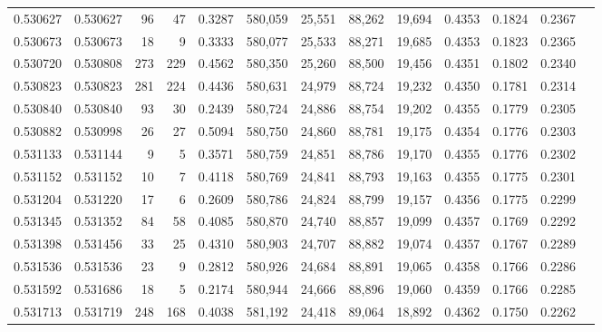 \begin{tabular}{rrrrrrrrrrrrr}
0.530627 & 0.530627 &    96 &    47 &                                     0.3287 & 580,059 &  25,551 &  88,262 &  19,694 & 0.4353 & 0.1824 & 0.2367 \\
0.530673 & 0.530673 &    18 &     9 &                                     0.3333 & 580,077 &  25,533 &  88,271 &  19,685 & 0.4353 & 0.1823 & 0.2365 \\
0.530720 & 0.530808 &   273 &   229 &                                     0.4562 & 580,350 &  25,260 &  88,500 &  19,456 & 0.4351 & 0.1802 & 0.2340 \\
0.530823 & 0.530823 &   281 &   224 &                                     0.4436 & 580,631 &  24,979 &  88,724 &  19,232 & 0.4350 & 0.1781 & 0.2314 \\
0.530840 & 0.530840 &    93 &    30 &                                     0.2439 & 580,724 &  24,886 &  88,754 &  19,202 & 0.4355 & 0.1779 & 0.2305 \\
0.530882 & 0.530998 &    26 &    27 &                                     0.5094 & 580,750 &  24,860 &  88,781 &  19,175 & 0.4354 & 0.1776 & 0.2303 \\
0.531133 & 0.531144 &     9 &     5 &                                     0.3571 & 580,759 &  24,851 &  88,786 &  19,170 & 0.4355 & 0.1776 & 0.2302 \\
0.531152 & 0.531152 &    10 &     7 &                                     0.4118 & 580,769 &  24,841 &  88,793 &  19,163 & 0.4355 & 0.1775 & 0.2301 \\
0.531204 & 0.531220 &    17 &     6 &                                     0.2609 & 580,786 &  24,824 &  88,799 &  19,157 & 0.4356 & 0.1775 & 0.2299 \\
0.531345 & 0.531352 &    84 &    58 &                                     0.4085 & 580,870 &  24,740 &  88,857 &  19,099 & 0.4357 & 0.1769 & 0.2292 \\
0.531398 & 0.531456 &    33 &    25 &                                     0.4310 & 580,903 &  24,707 &  88,882 &  19,074 & 0.4357 & 0.1767 & 0.2289 \\
0.531536 & 0.531536 &    23 &     9 &                                     0.2812 & 580,926 &  24,684 &  88,891 &  19,065 & 0.4358 & 0.1766 & 0.2286 \\
0.531592 & 0.531686 &    18 &     5 &                                     0.2174 & 580,944 &  24,666 &  88,896 &  19,060 & 0.4359 & 0.1766 & 0.2285 \\
0.531713 & 0.531719 &   248 &   168 &                                     0.4038 & 581,192 &  24,418 &  89,064 &  18,892 & 0.4362 & 0.1750 & 0.2262 \\

\end{tabular}
